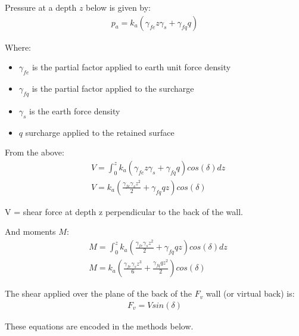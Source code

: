 \documentclass[11pt]{article}
\providecommand{\tightlist}{%
      \setlength{\itemsep}{0pt}\setlength{\parskip}{0pt}}
\begin{document}
Pressure at a depth \(z\) below is given by: \begin{align}
p_a = k_a(\gamma_{fe} z \gamma_s + \gamma_{fq} q)
\end{align}

Where:

\begin{itemize}
\tightlist
\item
  \(\gamma_{fe}\) is the partial factor applied to earth unit force
  density
\item
  \(\gamma_{fq}\) is the partial factor applied to the surcharge
\item
  \(\gamma_s\) is the earth force density
\item
  \(q\) surcharge applied to the retained surface
\end{itemize}

From the above: \begin{align}
&V = \int_0^z k_a(\gamma_{fe} z \gamma_s + \gamma_{fq} q) cos(\delta) dz\\
&V = k_a(\frac{\gamma_{fe} \gamma_{s} z^2}{2} + \gamma_{fq}qz)cos(\delta)
\end{align}

V = shear force at depth z perpendicular to the back of the wall.

And moments \(M\): \begin{align}
&M = \int_0^zk_a \left(\frac{\gamma_{fe} \gamma_{s} z^2}{2} + \gamma_{fq}qz \right)cos(\delta)dz\\
&M = k_a\left(\frac{\gamma_{fe} \gamma_{s} z^3}{6} + \frac{\gamma_{fq}qz^2}{2} \right)cos(\delta)
\end{align}

The shear applied over the plane of the back of the \(F_v\) wall (or
virtual back) is: \begin{align}
F_v = V sin(\delta)
\end{align}

These equations are encoded in the methods below.
\end{document}
